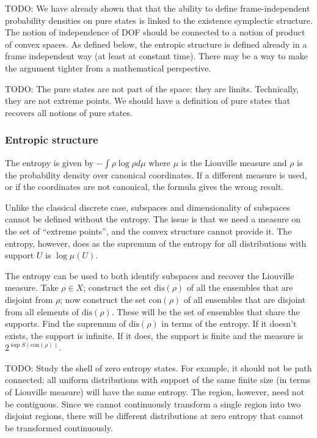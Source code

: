TODO: We have already shown that that the ability to define frame-independent probability densities on pure states is linked to the existence symplectic structure. The notion of independence of DOF should be connected to a notion of product of convex spaces. As defined below, the entropic structure is defined already in a frame independent way (at least at constant time). There may be a way to make the argument tighter from a mathematical perspective.

TODO: The pure states are not part of the space: they are limits. Technically, they are not extreme points. We should have a definition of pure states that recovers all notions of pure states.

\subsubsection{Entropic structure}

The entropy is given by $- \int \rho \log \rho d\mu$ where $\mu$ is the Liouville measure and $\rho$ is the probability density over canonical coordinates. If a different measure is used, or if the coordinates are not canonical, the formula gives the wrong result.

Unlike the classical discrete case, subspaces and dimensionality of subspaces cannot be defined without the entropy. The issue is that we need a measure on the set of ``extreme points'', and the convex structure cannot provide it. The entropy, however, does as the supremum of the entropy for all distributions with support $U$ is $\log \mu(U)$.

The entropy can be used to both identify subspaces and recover the Liouville measure. Take $\rho \in X$; construct the set $\text{dis}(\rho)$ of all the ensembles that are disjoint from $\rho$; now construct the set $\text{con}(\rho)$ of all ensembles that are disjoint from all elements of $\text{dis}(\rho)$. These will be the set of ensembles that share the supports. Find the supremum of $\text{dis}(\rho)$ in terms of the entropy. If it doesn't exists, the support is infinite. If it does, the support is finite and the measure is $2^{\sup S(\text{con}(\rho))}$.

TODO: Study the shell of zero entropy states. For example, it should not be path connected: all uniform distributions with support of the same finite size (in terms of Liouville measure) will have the same entropy. The region, however, need not be contiguous. Since we cannot continuously transform a single region into two disjoint regions, there will be different distributions at zero entropy that cannot be transformed continuously.


